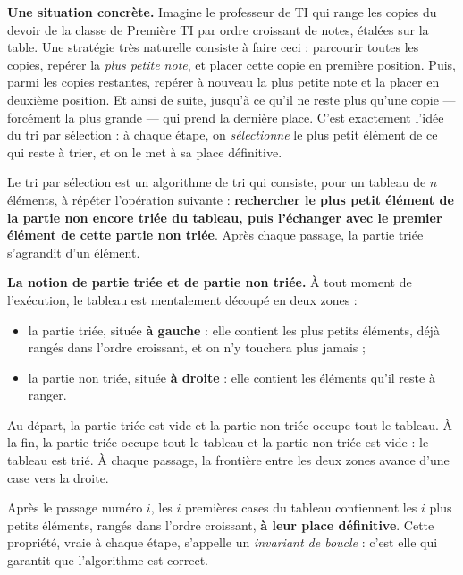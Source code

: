 \documentclass[11pt]{article}
\newcommand{\cle}[1]{{\popxbold\color{popdark}#1}}
\newcounter{popsec}
\newcounter{popsub}
\newcommand{\courssub}[1]{%
  \stepcounter{popsub}%
  \par\vspace{9pt}\noindent{\popxbold\fontsize{11.5}{13}\selectfont\color{popink}{\color{poporange}\thepopsec.\thepopsub}\hspace{6pt}#1}\par\nopagebreak\vspace{4pt}
}
\begin{document}
\courssub{Intuition et principe}

\textbf{Une situation concrète.} Imagine le professeur de TI qui range les copies du devoir de la classe de Première TI par ordre croissant de notes, étalées sur la table. Une stratégie très naturelle consiste à faire ceci : parcourir toutes les copies, repérer la \emph{plus petite note}, et placer cette copie en première position. Puis, parmi les copies restantes, repérer à nouveau la plus petite note et la placer en deuxième position. Et ainsi de suite, jusqu'à ce qu'il ne reste plus qu'une copie — forcément la plus grande — qui prend la dernière place. C'est exactement l'idée du tri par sélection : à chaque étape, on \emph{sélectionne} le plus petit élément de ce qui reste à trier, et on le met à sa place définitive.

\begin{definition}
Le \cle{tri par sélection} est un algorithme de tri qui consiste, pour un tableau de $n$ éléments, à répéter l'opération suivante : \textbf{rechercher le plus petit élément de la partie non encore triée du tableau, puis l'échanger avec le premier élément de cette partie non triée}. Après chaque passage, la partie triée s'agrandit d'un élément.
\end{definition}

\textbf{La notion de partie triée et de partie non triée.} À tout moment de l'exécution, le tableau est mentalement découpé en deux zones :

\begin{itemize}
\item la \cle{partie triée}, située \textbf{à gauche} : elle contient les plus petits éléments, déjà rangés dans l'ordre croissant, et on n'y touchera plus jamais ;
\item la \cle{partie non triée}, située \textbf{à droite} : elle contient les éléments qu'il reste à ranger.
\end{itemize}

Au départ, la partie triée est vide et la partie non triée occupe tout le tableau. À la fin, la partie triée occupe tout le tableau et la partie non triée est vide : le tableau est trié. À chaque passage, la frontière entre les deux zones avance d'une case vers la droite.

\begin{aretenir}
Après le passage numéro $i$, les $i$ premières cases du tableau contiennent les $i$ plus petits éléments, rangés dans l'ordre croissant, \textbf{à leur place définitive}. Cette propriété, vraie à chaque étape, s'appelle un \emph{invariant de boucle} : c'est elle qui garantit que l'algorithme est correct.
\end{aretenir}
\end{document}
